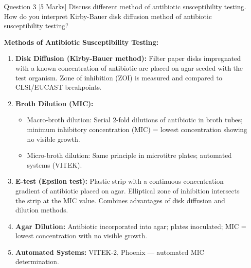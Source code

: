 \documentclass[11pt,a4paper]{article}
\begin{document}
\begin{qbox}{Question 3 [5 Marks]}
Discuss different method of antibiotic susceptibility testing. How do you interpret Kirby-Bauer disk diffusion method of antibiotic susceptibility testing?
\end{qbox}

\begin{ansbox}
\textbf{Methods of Antibiotic Susceptibility Testing:}
\begin{enumerate}[leftmargin=*]
    \item \textbf{Disk Diffusion (Kirby-Bauer method):} Filter paper disks impregnated with a known concentration of antibiotic are placed on agar seeded with the test organism. Zone of inhibition (ZOI) is measured and compared to CLSI/EUCAST breakpoints.
    \item \textbf{Broth Dilution (MIC):}
    \begin{itemize}
        \item Macro-broth dilution: Serial 2-fold dilutions of antibiotic in broth tubes; minimum inhibitory concentration (MIC) = lowest concentration showing no visible growth.
        \item Micro-broth dilution: Same principle in microtitre plates; automated systems (VITEK).
    \end{itemize}
    \item \textbf{E-test (Epsilon test):} Plastic strip with a continuous concentration gradient of antibiotic placed on agar. Elliptical zone of inhibition intersects the strip at the MIC value. Combines advantages of disk diffusion and dilution methods.
    \item \textbf{Agar Dilution:} Antibiotic incorporated into agar; plates inoculated; MIC = lowest concentration with no visible growth.
    \item \textbf{Automated Systems:} VITEK-2, Phoenix --- automated MIC determination.
\end{enumerate}


\end{ansbox}
\end{document}
